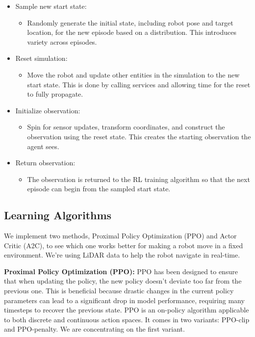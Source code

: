 \documentclass[conference]{IEEEtran}
\begin{document}
\begin{itemize}
\item Sample new start state:
\begin{itemize}
\item Randomly generate the initial state, including robot pose and target location, for the new episode based on a distribution. This introduces variety across episodes.

\end{itemize}

\item Reset simulation:
\begin{itemize}
\item Move the robot and update other entities in the simulation to the new start state. This is done by calling services and allowing time for the reset to fully propagate.
\end{itemize}

\item Initialize observation:

\begin{itemize}
\item Spin for sensor updates, transform coordinates, and construct the observation using the reset state. This creates the starting observation the agent sees.
\end{itemize}

\item Return observation:
\begin{itemize}
\item The observation is returned to the RL training algorithm so that the next episode can begin from the sampled start state.

\end{itemize}
\end{itemize}



\subsection{Learning Algorithms}

We implement two methods, Proximal Policy Optimization (PPO) and Actor Critic (A2C), to see which one works better for making a robot move in a fixed environment. We're using LiDAR data to help the robot navigate in real-time.

\textbf{Proximal Policy Optimization (PPO): }PPO has been designed to ensure that when updating the policy, the new policy doesn't deviate too far from the previous one. This is beneficial because drastic changes in the current policy parameters can lead to a significant drop in model performance, requiring many timesteps to recover the previous state. PPO is an on-policy algorithm applicable to both discrete and continuous action spaces. It comes in two variants: PPO-clip and PPO-penalty. We are concentrating on the first variant.
\end{document}
